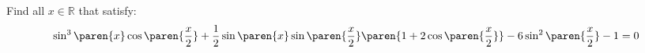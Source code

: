 Find all $x \in \mathbb{R}$ that satisfy:
\begin{equation*}
  \sin^3\paren{x} \cos\paren{\frac{x}{2}}
  + \frac{1}{2} \sin\paren{x} \sin\paren{\frac{x}{2}} \paren{1 + 2 \cos\paren{\frac{x}{2}}}
  - 6 \sin^2\paren{\frac{x}{2}}
  - 1
  = 0
\end{equation*}
